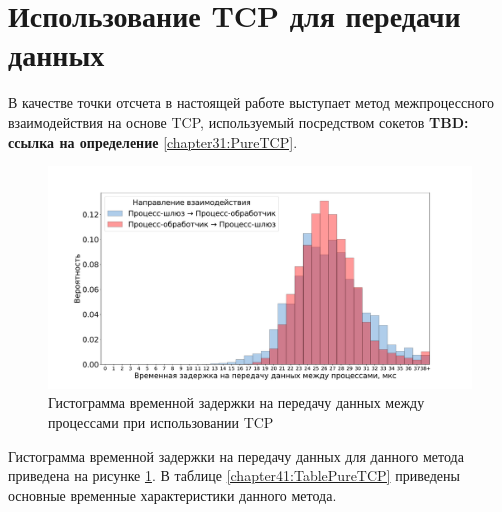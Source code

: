 \section{Использование TCP для передачи данных}

В качестве точки отсчета в настоящей работе выступает метод межпроцессного взаимодействия на основе TCP, используемый посредством сокетов 
\textbf{TBD: ссылка на определение}
\ref{chapter31:PureTCP}.

\begin{figure}[!h]
\caption{Гистограмма временной задержки на передачу данных между процессами при использовании TCP}
\label{chapter41:FigPureTCP}
\includegraphics[width=\textwidth]{../../graphics/hist/PureTCP}
\end{figure}

Гистограмма временной задержки на передачу данных для данного метода приведена на рисунке \ref{chapter41:FigPureTCP}. В таблице \ref{chapter41:TablePureTCP} приведены основные временные характеристики данного метода.

